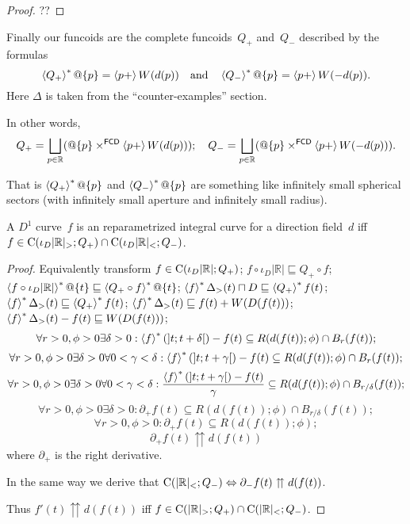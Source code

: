\begin{proof}
??
\end{proof}

Finally our funcoids are the complete funcoids~$Q_+$ and~$Q_-$ described by the formulas
\[
\left\langle Q_+\right\rangle ^{\ast}@\{p\} = \left\langle p+\right\rangle W(d(p)) \quad\text{and}\quad \left\langle Q_-\right\rangle ^{\ast}@\{p\} = \left\langle p+\right\rangle W(-d(p)).
\]
Here $\Delta$ is taken from the ``counter-examples'' section.

In other words,
\[
Q_+ = \bigsqcup_{p\in\mathbb{R}} (@\{p\}\times^{\mathsf{FCD}}\supfun{p+}{W(d(p))});
\quad
Q_- = \bigsqcup_{p\in\mathbb{R}} (@\{p\}\times^{\mathsf{FCD}}\supfun{p+}{W(-d(p))}).
\]

That is $\left\langle Q_+\right\rangle ^{\ast}@\{p\}$ and $\left\langle Q_-\right\rangle ^{\ast}@\{p\}$ are something like infinitely small spherical sectors
(with infinitely small aperture and infinitely small radius).


\begin{thm}
A $D^1$ curve~$f$ is an reparametrized integral curve for a direction field~$d$ iff
$f\in\mathrm{C}(\iota_D|\mathbb{R}|_{>};Q_+)\cap\mathrm{C}(\iota_D|\mathbb{R}|_{<};Q_-)$.
\end{thm}

\begin{proof}
Equivalently transform $f\in\mathrm{C}(\iota_D|\mathbb{R}|;Q_+)$; $f\circ \iota_D|\mathbb{R}|\sqsubseteq Q_+\circ f$;
$\left\langle f\circ \iota_D|\mathbb{R}|\right\rangle ^{\ast}@\{t\}\sqsubseteq \left\langle Q_+\circ f\right\rangle ^{\ast}@\{t\}$;
$\left\langle f\right\rangle ^{\ast}\Delta_{>}(t)\sqcap D\sqsubseteq \left\langle Q_+\right\rangle ^{\ast}f(t)$;
$\left\langle f\right\rangle ^{\ast}\Delta_{>}(t)\sqsubseteq \left\langle Q_+\right\rangle ^{\ast}f(t)$;
$\left\langle f\right\rangle ^{\ast}\Delta_{>}(t)\sqsubseteq f(t)+W(D(f(t)))$;
$\left\langle f\right\rangle ^{\ast}\Delta_{>}(t)-f(t)\sqsubseteq W(D(f(t)))$;
\[ \forall r>0, \phi>0 \exists\delta>0: \left\langle f\right\rangle ^{\ast}(]t;t+\delta[)-f(t)\subseteq R(d(f(t));\phi) \cap B_r(f(t)); \]
\[ \forall r>0, \phi>0 \exists\delta>0 \forall 0<\gamma<\delta: \left\langle f\right\rangle ^{\ast}(]t;t+\gamma[)-f(t)\subseteq R(d(f(t));\phi) \cap B_r(f(t)); \]
\[ \forall r>0, \phi>0 \exists\delta>0 \forall 0<\gamma<\delta: \frac{\left\langle f\right\rangle ^{\ast}(]t;t+\gamma[)-f(t)}{\gamma}\subseteq R(d(f(t));\phi) \cap B_{r/\delta}(f(t)); \]
\[ \forall r>0, \phi>0 \exists\delta>0: \partial_+ f(t)\subseteq R(d(f(t));\phi) \cap B_{r/\delta}(f(t)); \]
\[ \forall r>0, \phi>0: \partial_+ f(t)\subseteq R(d(f(t));\phi); \]
\[ \partial_+ f(t) \upuparrows d(f(t)) \]
where $\partial_+$ is the right derivative.

In the same way we derive that $\mathrm{C}(|\mathbb{R}|_{<};Q_-)\Leftrightarrow \partial_- f(t) \upuparrows d(f(t))$.

Thus $f'(t) \upuparrows d(f(t))$ iff $f\in\mathrm{C}(|\mathbb{R}|_{>};Q_+)\cap\mathrm{C}(|\mathbb{R}|_{<};Q_-)$.
\end{proof}

